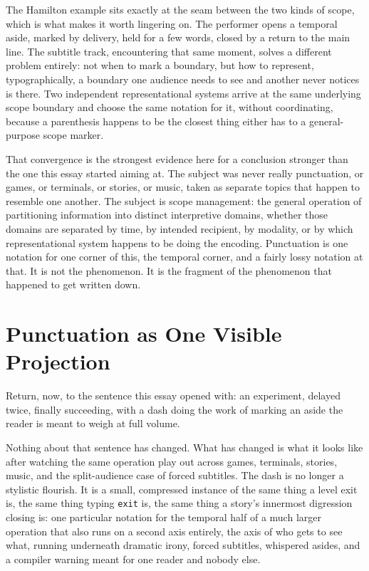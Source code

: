 \documentclass[11pt]{article}
\begin{document}
The Hamilton example sits exactly at the seam between the two kinds of scope, which is what makes it worth lingering on. The performer opens a temporal aside, marked by delivery, held for a few words, closed by a return to the main line. The subtitle track, encountering that same moment, solves a different problem entirely: not when to mark a boundary, but how to represent, typographically, a boundary one audience needs to see and another never notices is there. Two independent representational systems arrive at the same underlying scope boundary and choose the same notation for it, without coordinating, because a parenthesis happens to be the closest thing either has to a general-purpose scope marker.

That convergence is the strongest evidence here for a conclusion stronger than the one this essay started aiming at. The subject was never really punctuation, or games, or terminals, or stories, or music, taken as separate topics that happen to resemble one another. The subject is scope management: the general operation of partitioning information into distinct interpretive domains, whether those domains are separated by time, by intended recipient, by modality, or by which representational system happens to be doing the encoding. Punctuation is one notation for one corner of this, the temporal corner, and a fairly lossy notation at that. It is not the phenomenon. It is the fragment of the phenomenon that happened to get written down.

\section{Punctuation as One Visible Projection}

Return, now, to the sentence this essay opened with: an experiment, delayed twice, finally succeeding, with a dash doing the work of marking an aside the reader is meant to weigh at full volume.

Nothing about that sentence has changed. What has changed is what it looks like after watching the same operation play out across games, terminals, stories, music, and the split-audience case of forced subtitles. The dash is no longer a stylistic flourish. It is a small, compressed instance of the same thing a level exit is, the same thing typing \texttt{exit} is, the same thing a story's innermost digression closing is: one particular notation for the temporal half of a much larger operation that also runs on a second axis entirely, the axis of who gets to see what, running underneath dramatic irony, forced subtitles, whispered asides, and a compiler warning meant for one reader and nobody else.
\end{document}
